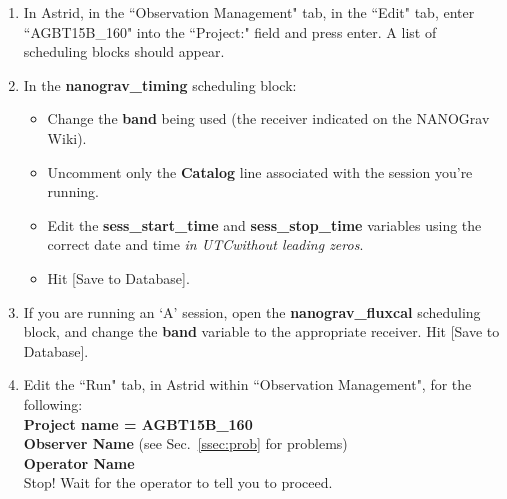 \documentclass[11pt, reqno, tbtags]{article}
\begin{document}
\begin{enumerate}
\begin{enumerate}
  \item In Astrid, in the ``Observation Management" tab, in the ``Edit" tab, enter \\``AGBT15B\_160" into the ``Project:" field and press enter. A list of scheduling blocks should appear. %

  \item In the \textbf{nanograv\_timing} scheduling block: \begin{itemize} %
   \item Change the \textbf{band} being used (the receiver indicated on the NANOGrav Wiki).  %

   \item Uncomment only the \textbf{Catalog} line associated with the session you're running.  %

   \item Edit the \textbf{sess\_start\_time} and \textbf{sess\_stop\_time} variables using the correct date and time \textit{in UTC\footnotemark[4] without leading zeros}.  %

   \item Hit [Save to Database].  %
  \end{itemize}

  \item If you are running an `A' session, open the \textbf{nanograv\_fluxcal} scheduling block, and change the \textbf{band} variable to the appropriate receiver.  Hit [Save to Database].  %

  \item Edit the ``Run" tab, in Astrid within ``Observation Management", for the following: \\  %
  \textbf{Project name = AGBT15B\_160 \\
  Observer Name} (see Sec.~\ref{ssec:prob} for problems)\\
  \textbf{Operator Name} \\
  Stop! Wait for the operator to tell you to proceed.
  \end{enumerate}
 \end{enumerate}


\end{document}
